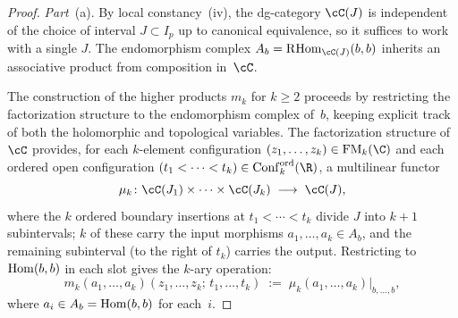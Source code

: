 \begin{proof}
\textit{Part}~(a).
By local constancy~(iv), the dg-category $\cC(J)$ is independent
of the choice of interval $J \subset I_p$ up to canonical
equivalence, so it suffices to work with a single $J$. The
endomorphism complex $A_b = \RHom_{\cC(J)}(b,b)$ inherits an
associative product from composition in~$\cC$.

The construction of the higher products $m_k$ for $k \ge 2$ proceeds
by restricting the factorization structure to the endomorphism
complex of~$b$, keeping explicit track of both the holomorphic and
topological variables. The factorization structure of~$\cC$
provides, for each $k$-element configuration
$(z_1,\ldots,z_k) \in \FM_k(\C)$ and each ordered open
configuration $(t_1 < \cdots < t_k) \in \Conf^{\mathrm{ord}}_k(\R)$,
a multilinear functor
\[
 \mu_k \colon
 \cC(J_1) \times \cdots \times \cC(J_k)
 \;\longrightarrow\; \cC(J),
\]
where the $k$ ordered boundary insertions at $t_1 < \cdots < t_k$ divide $J$ into $k+1$ subintervals; $k$ of these carry the input morphisms $a_1, \ldots, a_k \in A_b$, and the remaining subinterval (to the right of $t_k$) carries the output. Restricting to $\mathrm{Hom}(b,b)$ in each slot gives the
$k$-ary operation:
\[
 m_k(a_1,\ldots,a_k)(z_1,\ldots,z_k;\, t_1,\ldots,t_k)
 \;:=\;
 \mu_k(a_1,\ldots,a_k)\big|_{b,\ldots,b},
\]
where $a_i \in A_b = \mathrm{Hom}(b,b)$ for each~$i$.


\end{proof}
